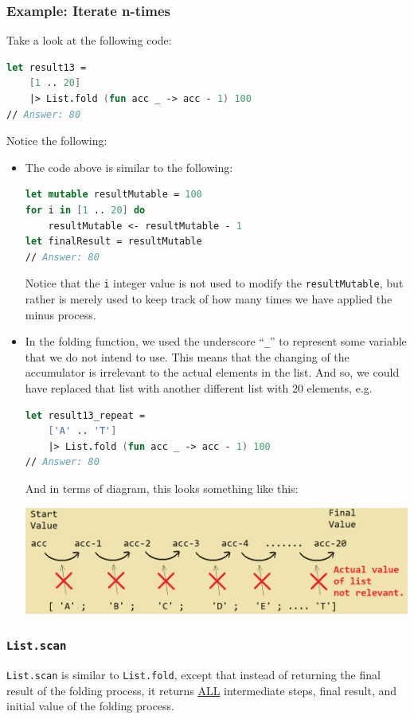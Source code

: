 \documentclass[12pt]{article}
\begin{document}
\pagebreak
\subsubsection*{Example: Iterate n-times}
Take a look at the following code:
\begin{lstlisting}[language=FSharp]
let result13 =
    [1 .. 20]
    |> List.fold (fun acc _ -> acc - 1) 100
// Answer: 80
\end{lstlisting}
Notice the following:
\begin{itemize}
\item The code above is similar to the following:
\begin{lstlisting}[language=FSharp]
let mutable resultMutable = 100
for i in [1 .. 20] do
    resultMutable <- resultMutable - 1
let finalResult = resultMutable
// Answer: 80
\end{lstlisting}
Notice that the \texttt{i} integer value is not used to modify the \texttt{resultMutable}, but rather is merely used to keep track of how many times we have applied the minus process.
\item In the folding function, we used the underscore ``\texttt{\_}'' to represent some variable that we do not intend to use. This means that the changing of the accumulator is irrelevant to the actual elements in the list. And so, we could have replaced that list with another different list with $20$ elements, e.g.
\begin{lstlisting}[language=FSharp]
let result13_repeat =
    ['A' .. 'T']
    |> List.fold (fun acc _ -> acc - 1) 100
// Answer: 80
\end{lstlisting}
And in terms of diagram, this looks something like this:
\begin{center}
\includegraphics[width=\textwidth]{pictures/picture37.png}
\end{center}
\end{itemize}

\pagebreak
\subsubsection*{\texttt{List.scan}}
\texttt{List.scan} is similar to \texttt{List.fold}, except that instead of returning the final result of the folding process, it returns \underline{ALL} intermediate steps, final result, and initial value of the folding process.
\end{document}

